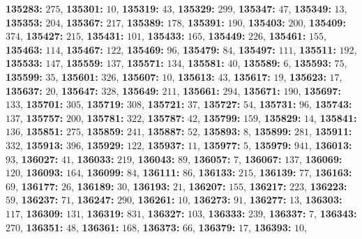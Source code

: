 \textsf{\bfseries 135283:} $275$, \textsf{\bfseries 135301:} $10$, \textsf{\bfseries 135319:} $43$, \textsf{\bfseries 135329:} $299$, \textsf{\bfseries 135347:} $47$, \textsf{\bfseries 135349:} $13$, \textsf{\bfseries 135353:} $204$, \textsf{\bfseries 135367:} $217$, \textsf{\bfseries 135389:} $178$, \textsf{\bfseries 135391:} $190$, \textsf{\bfseries 135403:} $200$, \textsf{\bfseries 135409:} $374$, \textsf{\bfseries 135427:} $215$, \textsf{\bfseries 135431:} $101$, \textsf{\bfseries 135433:} $165$, \textsf{\bfseries 135449:} $226$, \textsf{\bfseries 135461:} $155$, \textsf{\bfseries 135463:} $114$, \textsf{\bfseries 135467:} $122$, \textsf{\bfseries 135469:} $96$, \textsf{\bfseries 135479:} $84$, \textsf{\bfseries 135497:} $111$, \textsf{\bfseries 135511:} $192$, \textsf{\bfseries 135533:} $147$, \textsf{\bfseries 135559:} $137$, \textsf{\bfseries 135571:} $134$, \textsf{\bfseries 135581:} $40$, \textsf{\bfseries 135589:} $6$, \textsf{\bfseries 135593:} $75$, \textsf{\bfseries 135599:} $35$, \textsf{\bfseries 135601:} $326$, \textsf{\bfseries 135607:} $10$, \textsf{\bfseries 135613:} $43$, \textsf{\bfseries 135617:} $19$, \textsf{\bfseries 135623:} $17$, \textsf{\bfseries 135637:} $20$, \textsf{\bfseries 135647:} $328$, \textsf{\bfseries 135649:} $211$, \textsf{\bfseries 135661:} $294$, \textsf{\bfseries 135671:} $190$, \textsf{\bfseries 135697:} $133$, \textsf{\bfseries 135701:} $305$, \textsf{\bfseries 135719:} $308$, \textsf{\bfseries 135721:} $37$, \textsf{\bfseries 135727:} $54$, \textsf{\bfseries 135731:} $96$, \textsf{\bfseries 135743:} $137$, \textsf{\bfseries 135757:} $200$, \textsf{\bfseries 135781:} $322$, \textsf{\bfseries 135787:} $42$, \textsf{\bfseries 135799:} $159$, \textsf{\bfseries 135829:} $14$, \textsf{\bfseries 135841:} $136$, \textsf{\bfseries 135851:} $275$, \textsf{\bfseries 135859:} $241$, \textsf{\bfseries 135887:} $52$, \textsf{\bfseries 135893:} $8$, \textsf{\bfseries 135899:} $281$, \textsf{\bfseries 135911:} $332$, \textsf{\bfseries 135913:} $396$, \textsf{\bfseries 135929:} $122$, \textsf{\bfseries 135937:} $11$, \textsf{\bfseries 135977:} $5$, \textsf{\bfseries 135979:} $941$, \textsf{\bfseries 136013:} $93$, \textsf{\bfseries 136027:} $41$, \textsf{\bfseries 136033:} $219$, \textsf{\bfseries 136043:} $89$, \textsf{\bfseries 136057:} $7$, \textsf{\bfseries 136067:} $137$, \textsf{\bfseries 136069:} $120$, \textsf{\bfseries 136093:} $164$, \textsf{\bfseries 136099:} $84$, \textsf{\bfseries 136111:} $86$, \textsf{\bfseries 136133:} $215$, \textsf{\bfseries 136139:} $77$, \textsf{\bfseries 136163:} $69$, \textsf{\bfseries 136177:} $26$, \textsf{\bfseries 136189:} $30$, \textsf{\bfseries 136193:} $21$, \textsf{\bfseries 136207:} $155$, \textsf{\bfseries 136217:} $223$, \textsf{\bfseries 136223:} $59$, \textsf{\bfseries 136237:} $71$, \textsf{\bfseries 136247:} $290$, \textsf{\bfseries 136261:} $10$, \textsf{\bfseries 136273:} $91$, \textsf{\bfseries 136277:} $13$, \textsf{\bfseries 136303:} $117$, \textsf{\bfseries 136309:} $131$, \textsf{\bfseries 136319:} $831$, \textsf{\bfseries 136327:} $103$, \textsf{\bfseries 136333:} $239$, \textsf{\bfseries 136337:} $7$, \textsf{\bfseries 136343:} $270$, \textsf{\bfseries 136351:} $48$, \textsf{\bfseries 136361:} $168$, \textsf{\bfseries 136373:} $66$, \textsf{\bfseries 136379:} $17$, \textsf{\bfseries 136393:} $10$, 
